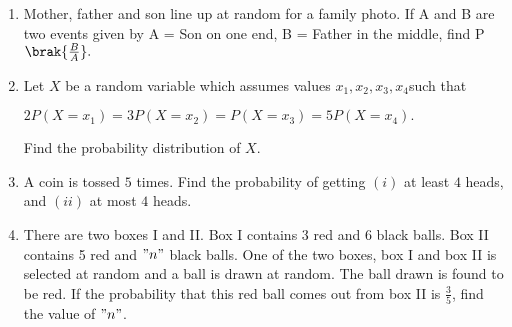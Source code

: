 
\begin{enumerate}

\item Mother, father and son line up at random for a family photo. If A and B
are two events given by A = Son on one end, B = Father in the middle, find P$\brak{\frac{B}{A}}.$


    \item Let $X$ be a random variable which assumes values $x_1, x_2, x_3, x_4 $such that 
    \begin{center}$2P(X = x_1) = 3P(X = x_2) = P(X = x_3) = 5P(X = x_4).$\end{center}
    Find the probability distribution of $X$.
    
    \item A coin is tossed $5$ times. Find the probability of getting $(i)$ at least $4$ heads, and $(ii)$ at most $4 $ heads.
    \item There are two boxes I and II. Box I contains 3 red and 6 black balls. Box II contains 5 red and $"n"$ black balls. One of the two boxes, box I and box II is selected at random and a ball is drawn at random. The ball drawn is found to be red. If the probability that this red ball comes out from box II is $\frac{3}{5}$, find the value of $"n"$. 

 \end{enumerate}

